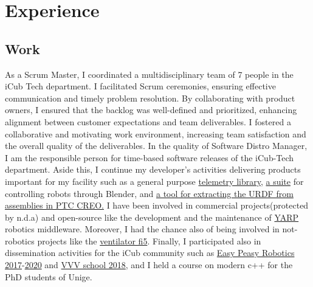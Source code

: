 \documentclass[10pt,a4paper]{moderncv}
\begin{document}
\section{Experience}
\subsection{Work}
{
As a Scrum Master, I coordinated a multidisciplinary team of 7 people in the iCub Tech department. I facilitated Scrum ceremonies, ensuring effective communication and timely problem resolution. By collaborating with product owners, I ensured that the backlog was well-defined and prioritized, enhancing alignment between customer expectations and team deliverables. I fostered a collaborative and motivating work environment, increasing team satisfaction and the overall quality of the deliverables.}
{
In the quality of Software Distro Manager, I am the responsible person for time-based software releases of the iCub-Tech department.
Aside this, I continue my developer's activities delivering products important for my facility such as a general purpose \href{https://github.com/robotology/yarp-telemetry}{telemetry library}, \href{https://github.com/robotology/blender-robotics-utils}{a suite} for controlling robots through Blender, and \href{https://github.com/icub-tech-iit/creo2urdf}{a tool for extracting the URDF from assemblies in PTC CREO.}}
{I have been involved in commercial projects(protected by n.d.a) and open-source like the development and the maintenance of \href{https://github.com/robotology/yarp}{YARP} robotics middleware.
Moreover, I had the chance also of being involved in not-robotics projects like the \href{https://github.com/icub-tech-iit/ventilator-fi5}{ventilator fi5}.
Finally, I participated also in dissemination activities for the iCub community such as \href{https://easy-peasy-robotics.github.io/editions/mfr17/course-program.html}{Easy Peasy Robotics 2017}-\href{https://easy-peasy-robotics.github.io/editions/web20/course-program.html}{2020}
and \href{http://www.icub.org/school/2018}{VVV school 2018}, and I held a course on modern c++ for the PhD students of Unige.}
\end{document}
